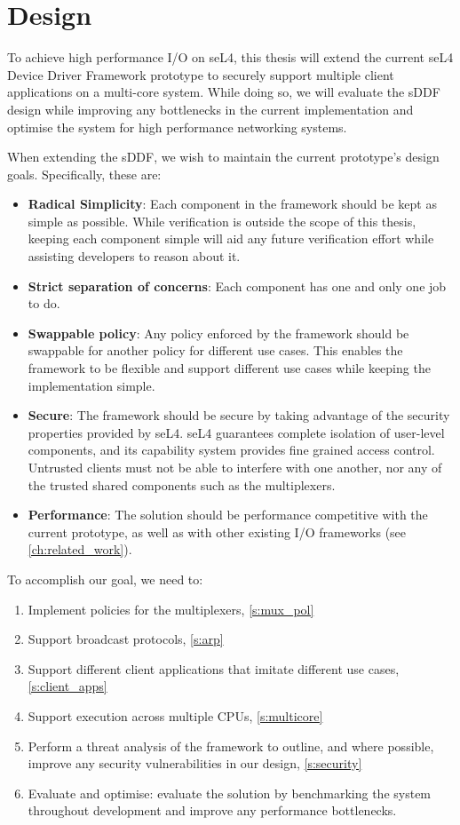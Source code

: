 \chapter{Design}\label{ch:design}

To achieve high performance I/O on seL4, this thesis will extend the current seL4 Device Driver Framework prototype 
to securely support multiple client applications on a multi-core system. While doing so, 
we will evaluate the sDDF design while improving any bottlenecks in the current implementation
and optimise the system for high performance networking systems.

When extending the sDDF, we wish to maintain the current prototype's design goals. 
Specifically, these are:
\begin{itemize}
\item \textbf{Radical Simplicity}: Each component in the framework should be kept as simple as possible. While verification is outside the scope
of this thesis, keeping each component simple will aid any future verification effort while assisting developers to reason about it.
\item \textbf{Strict separation of concerns}: Each component has one and only one job to do. 
\item \textbf{Swappable policy}: Any policy enforced by the framework should be swappable for another policy for different use cases.
This enables the framework to be flexible and support different use cases while keeping the implementation simple.
\item \textbf{Secure}: The framework should be secure by taking advantage of the security properties provided by seL4. seL4 guarantees
complete isolation of user-level components, and its capability system provides fine grained access control. Untrusted clients must not be able
to interfere with one another, nor any of the trusted shared components such as the multiplexers. 
\item \textbf{Performance}: The solution should be performance competitive with the current prototype,
as well as with other existing I/O frameworks (see \autoref{ch:related_work}).
\end{itemize}

To accomplish our goal, we need to:
\begin{enumerate}
    \item Implement policies for the multiplexers, \autoref{s:mux_pol}
    \item Support broadcast protocols, \autoref{s:arp}
    \item Support different client applications that imitate different use cases, \autoref{s:client_apps}
    \item Support execution across multiple CPUs, \autoref{s:multicore}
    \item Perform a threat analysis of the framework to outline, and where possible, improve any
         security vulnerabilities in our design, \autoref{s:security}
    \item Evaluate and optimise: evaluate the solution by benchmarking the system throughout development 
    and improve any performance bottlenecks.
\end{enumerate}


